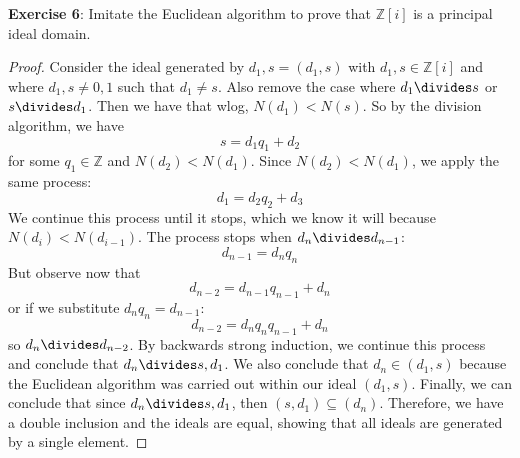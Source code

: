 \documentclass{article}
\begin{document}
\textbf{Exercise 6}: Imitate the Euclidean algorithm to prove that $\mathbb{Z}[i]$ is a principal ideal domain.
    \begin{proof}
        Consider the ideal generated by $d_{1}, s = (d_{1}, s)$ with $d_{1}, s \in \mathbb{Z}[i]$ and where $d_{1}, s \neq 0, 1$ such that $d_{1} \neq s$. Also remove the case where $d_{1} \divides s$ or $s \divides d_{1}$. Then we have that wlog, $N(d_{1}) < N(s)$. So by the division algorithm, we have
            \begin{equation*}
                s = d_{1}q_{1} + d_{2}
            \end{equation*}
        for some $q_{1} \in \mathbb{Z}$ and $N(d_{2}) < N(d_{1})$. Since $N(d_{2}) < N(d_{1})$, we apply the same process:
            \begin{equation*}
                d_{1} = d_{2}q_{2} + d_{3}
            \end{equation*}
        We continue this process until it stops, which we know it will because $N(d_{i}) < N(d_{i - 1})$. The process stops when $d_{n} \divides d_{n - 1}$:
            \begin{equation*}
                d_{n - 1} = d_{n}q_{n}
            \end{equation*}
        But observe now that
            \begin{equation*}
                d_{n - 2} = d_{n - 1}q_{n - 1} + d_{n}
            \end{equation*}
        or if we substitute $d_{n}q_{n} = d_{n - 1}$:
            \begin{equation*}
                d_{n - 2} = d_{n}q_{n}q_{n - 1} + d_{n}
            \end{equation*}
        so $d_{n} \divides d_{n - 2}$. By backwards strong induction, we continue this process and conclude that $d_{n} \divides s, d_{1}$. We also conclude that $d_{n} \in (d_{1}, s)$ because the Euclidean algorithm was carried out within our ideal $(d_{1}, s)$. Finally, we can conclude that since $d_{n} \divides s, d_{1}$, then $(s, d_{1}) \subseteq (d_{n})$. Therefore, we have a double inclusion and the ideals are equal, showing that all ideals are generated by a single element.
    \end{proof}
\end{document}
